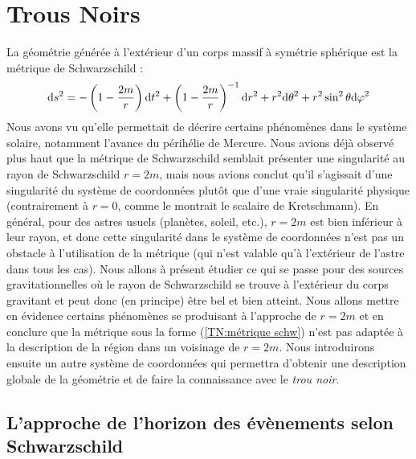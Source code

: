 \chapter{Trous Noirs}
La géométrie générée à l'extérieur d'un corps massif à symétrie sphérique est la métrique de Schwarzschild :
\begin{align}
    \label{TN:métrique schw}
    \mathrm{d} s^2 = - \left( 1 - \frac{2m}{r} \right) \mathrm{d} t^2 + \left( 1 - \frac{2m}{r} \right)^{-1} \mathrm{d} r^2 + r^2 \mathrm{d} \theta^2 + r^2 \sin^2\theta \mathrm{d} \varphi^2
\end{align}
Nous avons vu qu'elle permettait de décrire certains phénomènes dans le système solaire, notamment l'avance du périhélie de Mercure. Nous avions déjà observé plus haut que la métrique de Schwarzschild semblait présenter une singularité au rayon de Schwarzschild $r=2m$, mais nous avions conclut qu'il s'agissait d'une singularité du système de coordonnées plutôt que d'une vraie singularité physique (contrairement à $r =0$, comme le montrait le scalaire de Kretschmann). En général, pour des astres usuels (planètes, soleil, etc.), $r=2m$ est bien inférieur à leur rayon, et donc cette singularité dans le système de coordonnées n'est pas un obstacle à l'utilisation de la métrique (qui n'est valable qu'à l'extérieur de l'astre dans tous les cas). Nous allons à présent étudier ce qui se passe pour des sources gravitationnelles où le rayon de Schwarzschild se trouve à l'extérieur du corps gravitant et peut donc (en principe) être bel et bien atteint. Nous allons mettre en évidence certains phénomènes se produisant à l'approche de $r=2m$ et en conclure que la métrique sous la forme (\ref{TN:métrique schw}) n'est pas adaptée à la description de la région dans un voisinage de $r=2m$. Nous introduirons ensuite un autre système de coordonnées qui permettra d'obtenir une description globale de la géométrie et de faire la connaissance avec le \emph{trou noir}.
\section{L'approche de l'horizon des évènements selon Schwarzschild}
